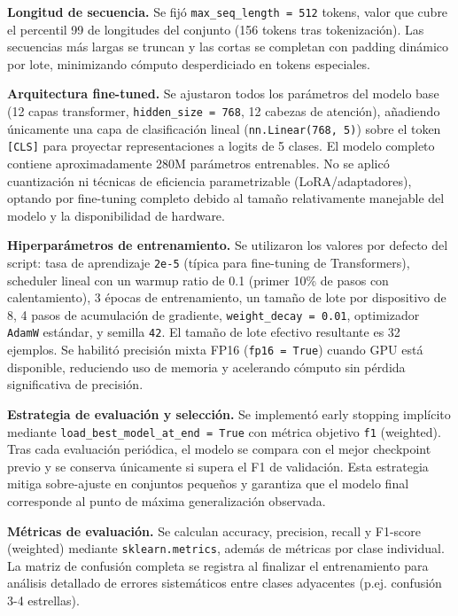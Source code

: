 \documentclass[paper=letter, fontsize=11pt, draft=false]{scrartcl}
\numberwithin{equation}{section} %
\numberwithin{figure}{section} %
\numberwithin{table}{section} %
\numberwithin{subsection}{section}
\begin{document}
\textbf{Longitud de secuencia.} Se fijó \texttt{max\_seq\_length = 512} tokens, valor que cubre el percentil 99 de longitudes del conjunto (156 tokens tras tokenización). Las secuencias más largas se truncan y las cortas se completan con padding dinámico por lote, minimizando cómputo desperdiciado en tokens especiales.

\textbf{Arquitectura fine-tuned.} Se ajustaron todos los parámetros del modelo base (12 capas transformer, \texttt{hidden\_size = 768}, 12 cabezas de atención), añadiendo únicamente una capa de clasificación lineal (\texttt{nn.Linear(768, 5)}) sobre el token \texttt{[CLS]} para proyectar representaciones a logits de 5 clases. El modelo completo contiene aproximadamente 280M parámetros entrenables. No se aplicó cuantización ni técnicas de eficiencia parametrizable (LoRA/adaptadores), optando por fine-tuning completo debido al tamaño relativamente manejable del modelo y la disponibilidad de hardware.

\textbf{Hiperparámetros de entrenamiento.} Se utilizaron los valores por defecto del script: tasa de aprendizaje \texttt{2e-5} (típica para fine-tuning de Transformers), scheduler lineal con un warmup ratio de 0.1 (primer 10\% de pasos con calentamiento), 3 épocas de entrenamiento, un tamaño de lote por dispositivo de 8, 4 pasos de acumulación de gradiente, \texttt{weight\_decay = 0.01}, optimizador \texttt{AdamW} estándar, y semilla \texttt{42}. El tamaño de lote efectivo resultante es 32 ejemplos. Se habilitó precisión mixta FP16 (\texttt{fp16 = True}) cuando GPU está disponible, reduciendo uso de memoria y acelerando cómputo sin pérdida significativa de precisión.

\textbf{Estrategia de evaluación y selección.} Se implementó early stopping implícito mediante \texttt{load\_best\_model\_at\_end = True} con métrica objetivo \texttt{f1} (weighted). Tras cada evaluación periódica, el modelo se compara con el mejor checkpoint previo y se conserva únicamente si supera el F1 de validación. Esta estrategia mitiga sobre-ajuste en conjuntos pequeños y garantiza que el modelo final corresponde al punto de máxima generalización observada.

\textbf{Métricas de evaluación.} Se calculan accuracy, precision, recall y F1-score (weighted) mediante \texttt{sklearn.metrics}, además de métricas por clase individual. La matriz de confusión completa se registra al finalizar el entrenamiento para análisis detallado de errores sistemáticos entre clases adyacentes (p.ej. confusión 3-4 estrellas).
\end{document}
